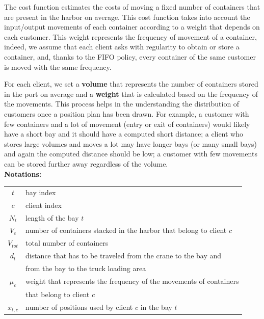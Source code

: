 \documentclass{article}
\begin{document}
The cost function estimates the costs of moving a fixed number of containers that are present in the harbor on average. 
This cost function takes into account the input/output movements of each container according to a weight that depends on each customer.
This weight represents the frequency of movement of a container, indeed, we assume that each client asks with regularity to obtain or store a container, and, thanks to the FIFO policy, every container of the same customer is moved with the same frequency. 


For each client, we set a \textbf {volume} that represents the number of containers stored in the port on average and a \textbf {weight} that is calculated based on the frequency of the movements. 
This process helps in the understanding  the distribution of customers once a position plan has been drawn. 
For example, a customer with few containers and a lot of movement (entry or exit of containers) would likely have a short bay and it should have a computed short distance; a client who stores large volumes and moves a lot may have longer bays (or many small bays) and again the computed distance should be low; a customer with few movements can be stored further away regardless of the volume. \\

\noindent
\textbf{Notations:} 

\begin{table}[!htb]
\centering
 \begin{tabular}{|c|l|}
\hline
$t$ & bay index \\[3pt]
$c$ & client index \\[3pt]
$N_t$ & length of the bay $t$ \\[3pt]
$V_c$ & number of containers stacked in the harbor that belong to client $c$ \\[3pt]
$V_{tot}$ & total number of containers \\[3pt]
$d_t$ & distance that has to be traveled from the crane to the bay and \\
& from the bay to the truck loading area \\[3pt]
$\mu_c$ & weight that represents the frequency of the movements of containers \\ 
& that belong to client $c$ \\[3pt]
$x_{t,c}$ & number of positions used by client $c$ in the bay $t$ \\[3pt]
\hline
\end{tabular}
\end{table}
\end{document}

